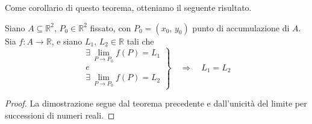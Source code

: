 Come corollario di questo teorema, otteniamo il seguente risultato.

\begin{cor}
Siano $A \subseteq \mathbb{R}^2$, $P_0 \in \mathbb{R}^2$ fissato, con $P_0=(x_0,\, y_0)$ punto di accumulazione di $A$. Sia $f : A \longrightarrow \mathbb{R}$, e siano $L_1,\, L_2 \in \mathbb{R}$ tali che
$$
\left.
\begin{array}{c}
\displaystyle \exists \, \lim_{P \rightarrow P_0} f(P) = L_1 \\ 
e \\
\displaystyle \exists \, \lim_{P \rightarrow P_0} f(P) = L_2
\end{array}
\right\rbrace
\quad \Longrightarrow \quad L_1 = L_2
$$
\end{cor}
\begin{proof}
La dimostrazione segue dal teorema precedente e dall'unicità del limite per successioni di numeri reali.
\end{proof}

